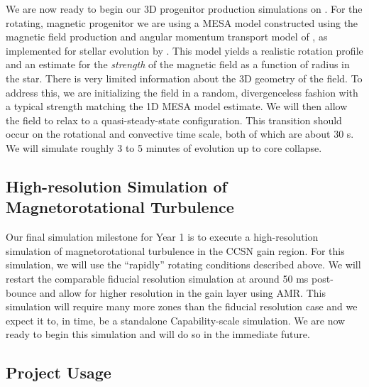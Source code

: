 \documentclass[12pt]{article}
\begin{document}
We are now ready to begin our 3D progenitor production simulations on \mira. 
For the rotating, magnetic progenitor we are using a MESA model constructed using the magnetic field production and angular momentum transport model of \citet{spruit:2002}, as implemented for stellar evolution by \citet{heger:2005, paxton:2015}.
This model yields a realistic rotation profile and an estimate for the {\it strength} of the magnetic field as a function of radius in the star. 
There is very limited information about the 3D geometry of the field.
To address this, we are initializing the field in a random, divergenceless fashion with a typical strength matching the 1D MESA model estimate.
We will then allow the field to relax to a quasi-steady-state configuration.
This transition should occur on the rotational and convective time scale, both of which are about 30 s. 
We will simulate roughly 3 to 5 minutes of evolution up to core collapse.

\subsection{High-resolution Simulation of Magnetorotational Turbulence}

Our final simulation milestone for Year 1 is to execute a high-resolution simulation of magnetorotational turbulence in the CCSN gain region. 
For this simulation, we will use the ``rapidly'' rotating conditions described above.
We will restart the comparable fiducial resolution simulation at around 50 ms post-bounce and allow for higher resolution in the gain layer using AMR.
This simulation will require many more zones than the fiducial resolution case and we expect it to, in time, be a standalone Capability-scale simulation.
We are now ready to begin this simulation and will do so in the immediate future.

\subsection{Project Usage}
\end{document}
